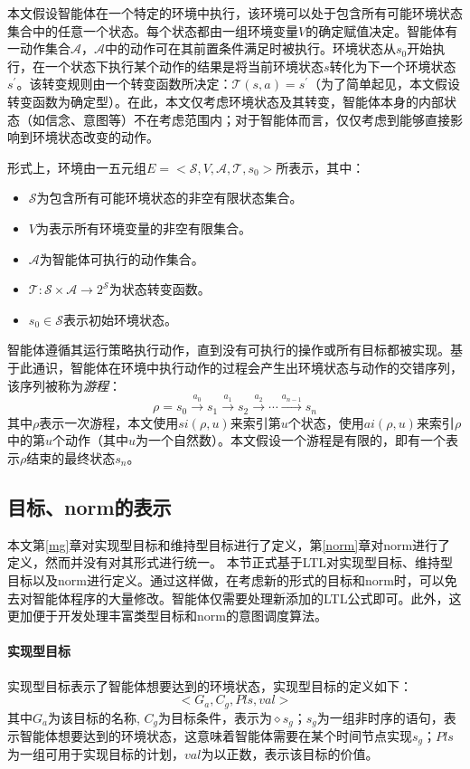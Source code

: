 本文假设智能体在一个特定的环境中执行，该环境可以处于包含所有可能环境状态集合中的任意一个状态。每个状态都由一组环境变量$V$的确定赋值决定。智能体有一动作集合$\mathcal{A}$，$\mathcal{A}$中的动作可在其前置条件满足时被执行。环境状态从$s_0$开始执行，在一个状态下执行某个动作的结果是将当前环境状态$s$转化为下一个环境状态$s^\prime$。该转变规则由一个转变函数所决定：$\mathcal{T} (s, a) = s^\prime$（为了简单起见，本文假设转变函数为确定型）。在此，本文仅考虑环境状态及其转变，智能体本身的内部状态（如信念、意图等）不在考虑范围内；对于智能体而言，仅仅考虑到能够直接影响到环境状态改变的动作。

形式上，环境由一五元组$E=<\mathcal{S}, V, \mathcal{A},\mathcal{T}, s_0>$所表示，其中：
\begin{itemize}
    \item $\mathcal{S}$为包含所有可能环境状态的非空有限状态集合。
    \item $V$为表示所有环境变量的非空有限集合。
    \item $\mathcal{A}$为智能体可执行的动作集合。
    \item $\mathcal{T}: \mathcal{S} \times \mathcal{A} \rightarrow 2^{\mathcal{S}}$为状态转变函数。
    \item $s_0 \in \mathcal{S}$表示初始环境状态。
\end{itemize}
智能体遵循其运行策略执行动作，直到没有可执行的操作或所有目标都被实现。基于此通识，智能体在环境中执行动作的过程会产生出环境状态与动作的交错序列，该序列被称为\emph{游程}：
\begin{equation}
\rho=s_0 \xrightarrow{\text{$a_0$}} s_1 \xrightarrow{\text{$a_1$}} s_2 \xrightarrow{\text{$a_2$}} \cdots \xrightarrow{\text{$a_{n-1}$}} s_n
\end{equation}
其中$\rho$表示一次游程，本文使用$si(\rho, u)$来索引第$u$个状态，使用$ai(\rho, u)$来索引$\rho$中的第$u$个动作（其中$u$为一个自然数）。本文假设一个游程是有限的，即有一个表示$\rho$结束的最终状态$s_n$。

\subsection{目标、norm的表示}
本文第\ref{mg}章对实现型目标和维持型目标进行了定义，第\ref{norm}章对norm进行了定义，然而并没有对其形式进行统一。
本节正式基于LTL对实现型目标、维持型目标以及norm进行定义。通过这样做，在考虑新的形式的目标和norm时，可以免去对智能体程序的大量修改。智能体仅需要处理新添加的LTL公式即可。此外，这更加便于开发处理丰富类型目标和norm的意图调度算法。

\paragraph{实现型目标}
实现型目标表示了智能体想要达到的环境状态，实现型目标的定义如下：
$$<G_a, C_g, Pls, val>$$
其中$G_a$为该目标的名称, $C_g$为目标条件，表示为$\diamond s_g$；$s_g$为一组非时序的语句，表示智能体想要达到的环境状态，这意味着智能体需要在某个时间节点实现$s_g$；$Pls$为一组可用于实现目标的计划，$val$为以正数，表示该目标的价值。


